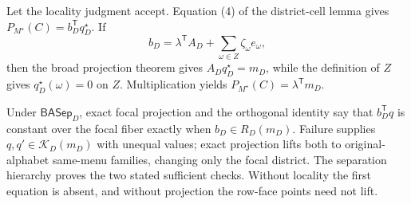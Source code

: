 Let the locality judgment accept.  Equation (4) of the district-cell lemma gives \(P_{M^\star}(C)=b_D^{\mathsf T}q_D^\star\).  If
\[
b_D=\lambda^{\mathsf T}A_D+\sum_{\omega\in Z}\zeta_\omega e_\omega,
\]
then the broad projection theorem gives \(A_Dq_D^\star=m_D\), while the definition of \(Z\) gives \(q_D^\star(\omega)=0\) on \(Z\).  Multiplication yields \(P_{M^\star}(C)=\lambda^{\mathsf T}m_D\).

Under \(\mathsf{BASep}_D\), exact focal projection and the orthogonal identity say that \(b_D^{\mathsf T}q\) is constant over the focal fiber exactly when \(b_D\in R_D(m_D)\).  Failure supplies \(q,q'\in\mathcal K_D(m_D)\) with unequal values; exact projection lifts both to original-alphabet same-menu families, changing only the focal district.  The separation hierarchy proves the two stated sufficient checks.  Without locality the first equation is absent, and without projection the row-face points need not lift.